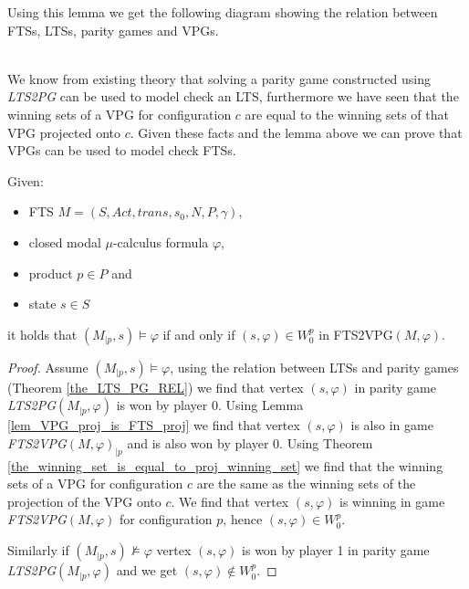 Using this lemma we get the following diagram showing the relation between FTSs, LTSs, parity games and VPGs.\\
\\
We know from existing theory that solving a parity game constructed using \textit{LTS2PG} can be used to model check an LTS, furthermore we have seen that the winning sets of a VPG for configuration $c$ are equal to the winning sets of that VPG projected onto $c$. Given these facts and the lemma above we can prove that VPGs can be used to model check FTSs.
\begin{theorem}
	\label{the_FTS2VPG_is_correct} Given:
	\begin{itemize}
		\item FTS $M = (S,Act,trans,s_0,N,P,\gamma)$,
		\item closed modal $\mu$-calculus formula $\varphi$,
		\item product $p \in P$ and
		\item state $s \in S$
	\end{itemize}
it holds that $(M_{|p},s) \models \varphi$ if and only if $(s,\varphi) \in W_0^p$ in FTS2VPG$(M,\varphi)$.
\begin{proof}
	Assume $(M_{|p},s) \models \varphi$, using the relation between LTSs and parity games (Theorem \ref{the_LTS_PG_REL}) we find that vertex $(s,\varphi)$ in parity game \textit{LTS2PG}$(M_{|p},\varphi)$ is won by player 0. Using Lemma \ref{lem_VPG_proj_is_FTS_proj} we find that vertex $(s,\varphi)$ is also in game \textit{FTS2VPG}$(M,\varphi)_{|p}$ and is also won by player 0. Using Theorem \ref{the_winning_set_is_equal_to_proj_winning_set} we find that the winning sets of a VPG for configuration $c$ are the same as the winning sets of the projection of the VPG onto $c$. We find that vertex $(s,\varphi)$ is winning in game \textit{FTS2VPG}$(M,\varphi)$ for configuration $p$, hence $(s,\varphi) \in W_0^p$.
	
	Similarly if $(M_{|p},s) \not\models \varphi$ vertex $(s,\varphi)$ is won by player 1 in parity game \textit{LTS2PG}$(M_{|p},\varphi)$ and we get $(s,\varphi) \notin W_0^p$.
\end{proof}
\end{theorem}

